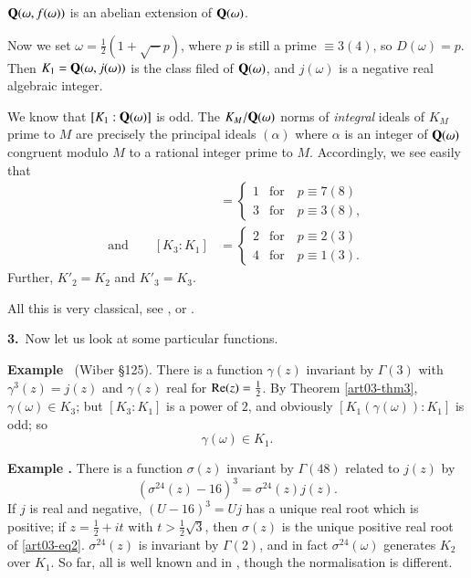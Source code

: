 \begin{coro*}
$\mathbf{Q}(\omega,f(\omega))$ is an abelian extension of $\mathbf{Q}(\omega)$.
\end{coro*}

Now we set $\omega=\frac{1}{2}(1+\surd-p)$, where $p$ is still a prime $\equiv 3(4)$, so $D(\omega)=p$. Then $K_{1}=\mathbf{Q}(\omega,j(\omega))$ is the class filed of $\mathbf{Q}(\omega)$, and $j(\omega)$ is a negative real algebraic integer.

We know that $[K_{1}:\mathbf{Q}(\omega)]$ is odd. The $K_{M}/\mathbf{Q}(\omega)$ norms of {\em integral} ideals of $K_{M}$ prime to $M$ are precisely the principal ideals $(\alpha)$ where $\alpha$ is an integer of $\mathbf{Q}(\omega)$ congruent modulo $M$ to a rational integer prime to $M$. Accordingly, we see easily that
\begin{align*}
[K_{2}:K_{1}] &= 
\begin{cases}
1 & \text{for~~ } p\equiv 7(8)\\[4pt]
3 & \text{for~~ } p\equiv 3(8),
\end{cases}\\
\text{and}\qquad [K_{3}:K_{1}] &=
\begin{cases}
2 & \text{for~~ } p\equiv 2(3)\\[4pt]
4 & \text{for~~ } p\equiv 1(3).
\end{cases}
\end{align*}
Further, $K'_{2}=K_{2}$ and $K'_{3}=K_{3}$.

All this is very classical, see \cite{art03-key9}, \cite{art03-key6} or \cite{art03-key3}.

\medskip
\noindent
{\bf 3.}~Now let us look at some particular functions.

\medskip
\noindent
{\bf Example \label{art03-exam1}}~(Wiber \cite{art03-key9} \S125).
There is a function $\gamma(z)$ invariant by $\Gamma(3)$ with $\gamma^{3}(z)=j(z)$ and $\gamma(z)$ real for $\operatorname{\mathrm{Re}}(z)=\frac{1}{2}$. By Theorem \ref{art03-thm3}, $\gamma(\omega)\in K_{3}$; but $[K_{3}:K_{1}]$ is a power of $2$, and obviously $[K_{1}(\gamma(\omega)):K_{1}]$ is odd; so
\begin{equation*}
\gamma(\omega)\in K_{1}.\tag{1}\label{art03-eq1}
\end{equation*}

\medskip
\noindent
{\bf Example .\label{art03-exam2}}
There is a function $\sigma(z)$ invariant by $\Gamma(48)$ related to $j(z)$ by
\begin{equation*}
(\sigma^{24}(z)-16)^{3}=\sigma^{24}(z)j(z).\tag{2}\label{art03-eq2}
\end{equation*}
If $j$ is real and negative, $(U-16)^{3}=Uj$ has a unique real root which is positive; if $z=\frac{1}{2}+it$ with $t>\frac{1}{2}\surd 3$, then $\sigma(z)$ is the unique positive real root of \eqref{art03-eq2}. $\sigma^{24}(z)$ is invariant by $\Gamma(2)$, and in fact $\sigma^{24}(\omega)$ generates $K_{2}$ over $K_{1}$. So far, all is well known and in \cite{art03-key9}, though the normalisation is different.
\smallskip

